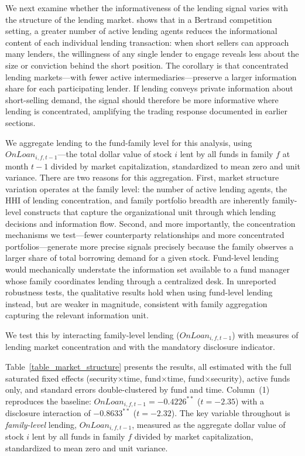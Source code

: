 
We next examine whether the informativeness of the lending signal varies with the structure of the lending market. \citet{Nurisso2026} shows that in a Bertrand competition setting, a greater number of active lending agents reduces the informational content of each individual lending transaction: when short sellers can approach many lenders, the willingness of any single lender to engage reveals less about the size or conviction behind the short position. The corollary is that concentrated lending markets---with fewer active intermediaries---preserve a larger information share for each participating lender. If lending conveys private information about short-selling demand, the signal should therefore be more informative where lending is concentrated, amplifying the trading response documented in earlier sections.

We aggregate lending to the fund-family level for this analysis, using $OnLoan_{i,f,t-1}$---the total dollar value of stock $i$ lent by all funds in family $f$ at month $t-1$ divided by market capitalization, standardized to mean zero and unit variance. There are two reasons for this aggregation. First, market structure variation operates at the family level: the number of active lending agents, the HHI of lending concentration, and family portfolio breadth are inherently family-level constructs that capture the organizational unit through which lending decisions and information flow. Second, and more importantly, the concentration mechanisms we test---fewer counterparty relationships and more concentrated portfolios---generate more precise signals precisely because the family observes a larger share of total borrowing demand for a given stock. Fund-level lending would mechanically understate the information set available to a fund manager whose family coordinates lending through a centralized desk. In unreported robustness tests, the qualitative results hold when using fund-level lending instead, but are weaker in magnitude, consistent with family aggregation capturing the relevant information unit.

We test this by interacting family-level lending ($OnLoan_{i,f,t-1}$) with measures of lending market concentration and with the mandatory disclosure indicator.

Table~\ref{table_market_structure} presents the results, all estimated with the full saturated fixed effects (security$\times$time, fund$\times$time, fund$\times$security), active funds only, and standard errors double-clustered by fund and time. Column~(1) reproduces the baseline: $OnLoan_{i,f,t-1} = -0.4226^{**}$ ($t = -2.35$) with a disclosure interaction of $-0.8633^{**}$ ($t = -2.32$). The key variable throughout is \textit{family-level} lending, $OnLoan_{i,f,t-1}$, measured as the aggregate dollar value of stock $i$ lent by all funds in family $f$ divided by market capitalization, standardized to mean zero and unit variance.

